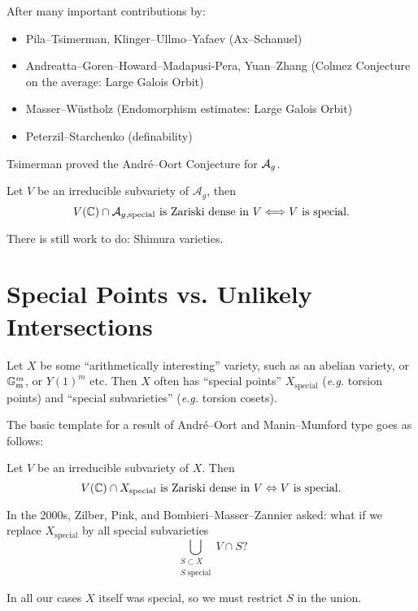 \documentclass{beamer}
\begin{document}
\begin{frame}
  After many important contributions by:

  \begin{itemize}
  \item  Pila--Tsimerman, Klinger--Ullmo--Yafaev (Ax--Schanuel)
  \item   Andreatta--Goren--Howard--Madapusi-Pera, Yuan--Zhang (Colmez
    Conjecture on the average: Large Galois Orbit)
  \item Masser--Wüstholz (Endomorphism estimates: Large Galois Orbit)
  \item   Peterzil--Starchenko (definability)    
  \end{itemize}

  Tsimerman proved the Andr\'e--Oort Conjecture for ${\mathcal A}_g$. 
  \begin{theorem}[Tsimerman]
    Let $V$ be an irreducible subvariety of $\mathcal{A}_g$, then
    \begin{equation*}
      V({\mathbb{C}})\cap \mathcal{A}_{g,\mathrm{special}} \text{ is Zariski
        dense in $V$}\Longleftrightarrow V\text{ is special.}
    \end{equation*}
  \end{theorem}

  There is still work to do: Shimura varieties.
\end{frame}

\section{Special Points vs. Unlikely Intersections}

\begin{frame}

  Let $X$ be some ``arithmetically interesting'' variety, such as an
  abelian variety, or ${\mathbb{G}}_{\mathrm{m}}^m$, or $Y(1)^m$ etc.
  Then $X$ often  has
   ``special points'' $X_{\mathrm{special}}$ (\textit{e.g.} torsion points) and ``special
  subvarieties'' (\textit{e.g.} torsion cosets).

  The basic template for a result of Andr\'e--Oort and Manin--Mumford
  type goes as follows:
  
  Let $V$ be an irreducible subvariety of
  $X$. Then
  \begin{equation*}
    V({\mathbb{C}}) \cap X_{\mathrm{special}}\text{ is Zariski dense in
      $V$}\Leftrightarrow \text{$V$ is special}.
  \end{equation*}

  In the 2000s,
  Zilber, Pink, and Bombieri--Masser--Zannier asked: what if we
  replace $X_{\mathrm{special}}$ by all special subvarieties
  \begin{equation*}
    \bigcup_{\substack{S\subset X \\ \text{$S$ special}}} V\cap S?
  \end{equation*}

  In all our cases $X$ itself was special, so we must restrict
  $S$ in the union.  
\end{frame}
\end{document}
